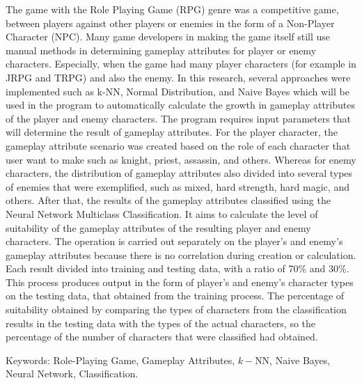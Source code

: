 \begin{spacing}{1}
	The game with the Role Playing Game (RPG) genre was a competitive game, between players against other players or enemies in the form of a Non-Player Character (NPC). Many game developers in making the game itself still use manual methods in determining gameplay attributes for player or enemy characters. Especially, when the game had many player characters (for example in JRPG and TRPG) and also the enemy. In this research, several approaches were implemented such as k-NN, Normal Distribution, and Naive Bayes which will be used in the program to automatically calculate the growth in gameplay attributes of the player and enemy characters. The program requires input parameters that will determine the result of gameplay attributes. For the player character, the gameplay attribute scenario was created based on the role of each character that user want to make such as knight, priest, assassin, and others. Whereas for enemy characters, the distribution of gameplay attributes also divided into several types of enemies that were exemplified, such as mixed, hard strength, hard magic, and others. After that, the results of the gameplay attributes classified using the Neural Network Multiclass Classification. It aims to calculate the level of suitability of the gameplay attributes of the resulting player and enemy characters. The operation is carried out separately on the player's and enemy's gameplay attributes because there is no correlation during creation or calculation. Each result divided into training and testing data, with a ratio of 70\% and 30\%. This process produces output in the form of player's and enemy's character types on the testing data, that obtained from the training process. The percentage of suitability obtained by comparing the types of characters from the classification results in the testing data with the types of the actual characters, so the percentage of the number of characters that were classified had obtained.
	\vspace{2ex}

	Keywords: Role-Playing Game, Gameplay Attributes, $k-$NN, Naive Bayes, Neural Network, Classification.
\end{spacing}